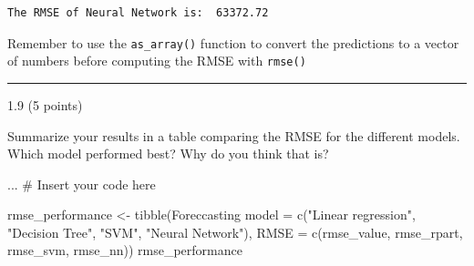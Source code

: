 \documentclass[
  letterpaper,
  DIV=11,
  numbers=noendperiod]{scrartcl}
\newenvironment{Shaded}{\begin{snugshade}}{\end{snugshade}}
\newcommand{\AttributeTok}[1]{\textcolor[rgb]{0.40,0.45,0.13}{#1}}
\newcommand{\CommentTok}[1]{\textcolor[rgb]{0.37,0.37,0.37}{#1}}
\newcommand{\FunctionTok}[1]{\textcolor[rgb]{0.28,0.35,0.67}{#1}}
\newcommand{\NormalTok}[1]{\textcolor[rgb]{0.00,0.23,0.31}{#1}}
\newcommand{\OtherTok}[1]{\textcolor[rgb]{0.00,0.23,0.31}{#1}}
\newcommand{\StringTok}[1]{\textcolor[rgb]{0.13,0.47,0.30}{#1}}
\begin{document}
\begin{verbatim}
The RMSE of Neural Network is:  63372.72
\end{verbatim}

\begin{tcolorbox}[enhanced jigsaw, bottomtitle=1mm, rightrule=.15mm, left=2mm, colback=white, opacityback=0, bottomrule=.15mm, titlerule=0mm, toprule=.15mm, colframe=quarto-callout-warning-color-frame, arc=.35mm, colbacktitle=quarto-callout-warning-color!10!white, breakable, leftrule=.75mm, coltitle=black, title=\textcolor{quarto-callout-warning-color}{\faExclamationTriangle}\hspace{0.5em}{Warning}, opacitybacktitle=0.6, toptitle=1mm]

Remember to use the \texttt{as\_array()} function to convert the
predictions to a vector of numbers before computing the RMSE with
\texttt{rmse()}

\end{tcolorbox}

\begin{center}\rule{0.5\linewidth}{0.5pt}\end{center}

1.9 (5 points)

Summarize your results in a table comparing the RMSE for the different
models. Which model performed best? Why do you think that is?

\begin{Shaded}
\begin{Highlighting}[]
\NormalTok{... }\CommentTok{\# Insert your code here}
\end{Highlighting}
\end{Shaded}

\begin{Shaded}
\begin{Highlighting}[]
\NormalTok{rmse\_performance }\OtherTok{\textless{}{-}} \FunctionTok{tibble}\NormalTok{(}\StringTok{\textasciigrave{}}\AttributeTok{Foreccasting model}\StringTok{\textasciigrave{}} \OtherTok{=} \FunctionTok{c}\NormalTok{(}\StringTok{"Linear regression"}\NormalTok{, }\StringTok{"Decision Tree"}\NormalTok{,}
                                                    \StringTok{"SVM"}\NormalTok{, }\StringTok{"Neural Network"}\NormalTok{),}
                           \AttributeTok{RMSE =} \FunctionTok{c}\NormalTok{(rmse\_value, rmse\_rpart, rmse\_svm, rmse\_nn))}
\NormalTok{rmse\_performance}
\end{Highlighting}
\end{Shaded}
\end{document}
